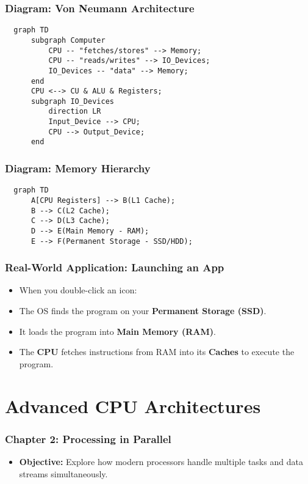 \documentclass{beamer}
\begin{document}
\begin{frame}[fragile]
  \frametitle{Diagram: Von Neumann Architecture}
  \begin{verbatim}
  graph TD
      subgraph Computer
          CPU -- "fetches/stores" --> Memory;
          CPU -- "reads/writes" --> IO_Devices;
          IO_Devices -- "data" --> Memory;
      end
      CPU <--> CU & ALU & Registers;
      subgraph IO_Devices
          direction LR
          Input_Device --> CPU;
          CPU --> Output_Device;
      end
  \end{verbatim}
\end{frame}

\begin{frame}[fragile]
  \frametitle{Diagram: Memory Hierarchy}
  \begin{verbatim}
  graph TD
      A[CPU Registers] --> B(L1 Cache);
      B --> C(L2 Cache);
      C --> D(L3 Cache);
      D --> E(Main Memory - RAM);
      E --> F(Permanent Storage - SSD/HDD);
  \end{verbatim}
\end{frame}

\begin{frame}
  \frametitle{Real-World Application: Launching an App}
  \begin{itemize}
    \item When you double-click an icon:
    \item The OS finds the program on your \textbf{Permanent Storage (SSD)}.
    \item It loads the program into \textbf{Main Memory (RAM)}.
    \item The \textbf{CPU} fetches instructions from RAM into its \textbf{Caches} to execute the program.
  \end{itemize}
\end{frame}

\section{Advanced CPU Architectures}

\begin{frame}
  \frametitle{Chapter 2: Processing in Parallel}
  \begin{itemize}
    \item \textbf{Objective:} Explore how modern processors handle multiple tasks and data streams simultaneously.
  \end{itemize}
\end{frame}
\end{document}
